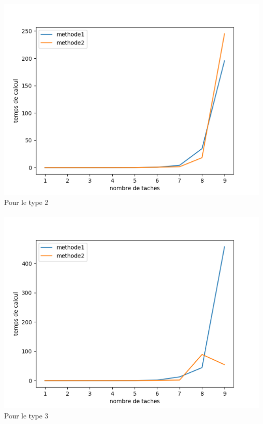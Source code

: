 \documentclass[a4paper, 10pt]{article}
\begin{document}
                \paragraph{}{
                  \includegraphics{graphes/exact_vs_mix_type2.png}
                  Pour le type 2
                }
                \paragraph{}{
                  \includegraphics{graphes/exact_vs_mix_type3.png}
                  Pour le type 3
                }
                  
\end{document}
